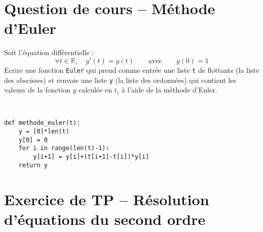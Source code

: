 





\begin{center}
{\Large\bf {\type} \no {\num}}
\end{center}



\section{Question de cours -- Méthode d'Euler}
Soit l'équation différentielle : 
\[\forall t\in\mathbb{R},\quad y'(t)=y(t)\qquad\text{avec}\qquad y(0)=1\]
Ecrire une fonction \verb?Euler? qui prend comme entrée une liste \verb?t? de flottants (la liste des abscisses) et renvoie une liste \verb?y? (la liste des ordonnées) qui contient les valeurs de la fonction $y$ calculée en $t_i$ à l'aide de la méthode d'Euler.
\begin{solution}~\\
\vspace*{-0.7cm}
\begin{verbatim}
def methode_euler(t):
    y = [0]*len(t)
    y[0] = 0
    for i in range(len(t)-1):
        y[i+1] = y[i]+(t[i+1]-t[i])*y[i]
    return y
\end{verbatim}    
\end{solution}


\section{Exercice de TP -- R\' esolution d'\' equations du second ordre}


